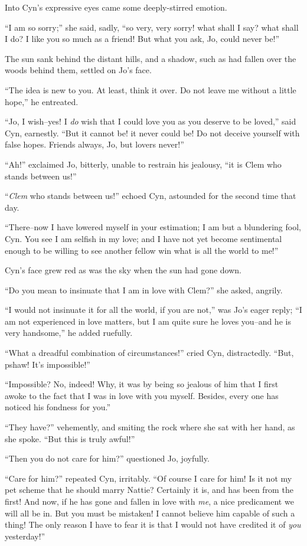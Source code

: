 Into Cyn's expressive eyes came some deeply-stirred emotion.

``I am so sorry;'' she said, sadly, ``so very, very sorry! what shall I
say? what shall I do? I like you so much as a friend! But what you ask,
Jo, could never be!''

The sun sank behind the distant hills, and a shadow, such as had fallen
over the woods behind them, settled on Jo's face.

``The idea is new to you. At least, think it over. Do not leave me
without a little hope,'' he entreated.

``Jo, I wish--yes! I \emph{do} wish that I could love you as you deserve to be
loved,'' said Cyn, earnestly. ``But it cannot be! it never could be! Do
not deceive yourself with false hopes. Friends always, Jo, but lovers
never!''

``Ah!'' exclaimed Jo, bitterly, unable to restrain his jealousy, ``it is
Clem who stands between us!''

``\emph{Clem} who stands between us!'' echoed Cyn, astounded for the second time
that day.

``There--now I have lowered myself in your estimation; I am but a
blundering fool, Cyn. You see I am selfish in my love; and I have not
yet become sentimental enough to be willing to see another fellow win
what is all the world to me!''

Cyn's face grew red as was the sky when the sun had gone down.

``Do you mean to insinuate that I am in love with Clem?'' she asked,
angrily.

``I would not insinuate it for all the world, if you are not,'' was Jo's
eager reply; ``I am not experienced in love matters, but I am quite sure
he loves you--and he is very handsome,'' he added ruefully.

``What a dreadful combination of circumstances!'' cried Cyn, distractedly.
``But, pshaw! It's impossible!''

``Impossible? No, indeed! Why, it was by being so jealous of him that I
first awoke to the fact that I was in love with you myself. Besides,
every one has noticed his fondness for you.''

``They have?'' vehemently, and smiting the rock where she sat with her
hand, as she spoke. ``But this is truly awful!''

``Then you do not care for him?'' questioned Jo, joyfully.

``Care for him?'' repeated Cyn, irritably. ``Of course I care for him! Is
it not my pet scheme that he should marry Nattie? Certainly it is, and
has been from the first! And now, if he has gone and fallen in love with
\emph{me}, a nice predicament we will all be in. But you must be mistaken! I
cannot believe him capable of such a thing! The only reason I have to
fear it is that I would not have credited it of \emph{you} yesterday!''

